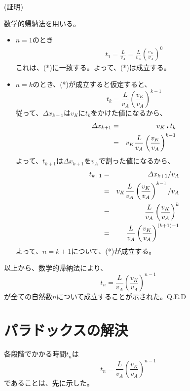 \documentclass[12pt,a4paper,fleqn]{ltjsarticle}
\begin{document}
(証明)

数学的帰納法を用いる。
\begin{itemize}
\item $n = 1$のとき
\begin{eqnarray*}
   t_1 = \frac{L}{v_A} = \frac{L}{v_A}\left( \frac{v_K}{v_A} \right)^0
\end{eqnarray*}
これは、(*)に一致する。よって、(*)は成立する。

\item $n = k$のとき、(*)が成立すると仮定すると、
  \begin{displaymath}
    t_k = \frac{L}{v_A}\left( \frac{v_K}{v_A} \right)^{k-1}
  \end{displaymath}
  従って、$\varDelta x_{k+1}$は$v_K$に$t_k$をかけた値になるから、
\begin{eqnarray*}
  \varDelta x_{k+1} &=& v_K \centerdot t_k \notag \\
                    &=& v_K \frac{L}{v_A}\left( \frac{v_K}{v_A} \right)^{k-1} \notag
\end{eqnarray*}
    よって、$t_{k+1}$は$\varDelta x_{k+1}$を$v_A$で割った値になるから、
\begin{eqnarray*}
  t_{k+1} &=& \varDelta x_{k+1} / v_A \notag \\
          &=& v_K\frac{L}{v_A}\left( \frac{v_K}{v_A} \right)^{k-1} / {v_A}  \notag \\
          &=& \frac{L}{v_A}\left( \frac{v_K}{v_A} \right)^{k} \\
          &=& \frac{L}{v_A}\left( \frac{v_K}{v_A} \right)^{(k+1)-1}
\end{eqnarray*}
よって、$n = k+1$について、(*)が成立する。
\end{itemize}
以上から、数学的帰納法により、
\begin{displaymath}
  t_n = \frac{L}{v_A}\left( \frac{v_K}{v_A} \right)^{n-1} \tag{$*$}
\end{displaymath}
が全ての自然数$n$について成立することが示された。\hspace{\fill}Q.E.D

\newpage

\section{パラドックスの解決}
各段階でかかる時間$t_n$は
\begin{displaymath}
  t_n = \frac{L}{v_A}\left( \frac{v_K}{v_A} \right)^{n-1} \tag{$*$}
\end{displaymath}
であることは、先に示した。
\end{document}

